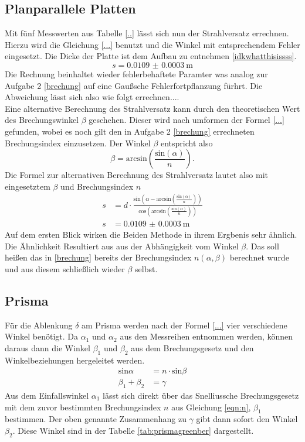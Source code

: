 \subsection{Planparallele Platten}
Mit fünf Messwerten aus Tabelle \ref{..} lässt sich nun der Strahlversatz errechnen. Hierzu wird die Gleichung \eqref{...}
benutzt und die Winkel mit entsprechendem Fehler eingesetzt. Die Dicke der Platte ist dem Aufbau zu entnehmen \ref{idkwhatthisissss}.
\begin{equation*}
    s = \SI{0.0109(00003)}{\meter}
\end{equation*}
Die Rechnung beinhaltet wieder fehlerbehaftete Paramter was analog zur Aufgabe 2 \ref{brechung} auf eine Gaußsche Fehlerfortpflanzung 
fürhrt. Die Abweichung lässt sich also wie folgt errechnen....
\\

Eine alternative Berechnung des Strahlversatz kann durch den theoretischen Wert des Brechungswinkel $\beta$ geschehen. 
Dieser wird nach umformen der Formel \eqref{...} gefunden, wobei es noch gilt den in Aufgabe 2 \ref{brechung} errechneten Brechungsindex
einzusetzen. Der Winkel $\beta$ entspricht also
\begin{equation*}
    \beta  = \text{arcsin} \left( \frac{\text{sin}(\alpha)}{n}\right).
\end{equation*}
Die Formel zur alternativen Berechnung des Strahlversatz lautet also mit eingesetztem $\beta$ und Brechungsindex $n$
\begin{align*}
    s &= d  \cdot \frac{\text{sin} \left (  \alpha- \text{arcsin} \left( \frac{\text{sin}(\alpha)}{n}\right) \right)} {\text{cos}\left(\text{arcsin} \left( \frac{\text{sin}(\alpha)}{n}\right)\right)}\\
    s &= \SI{0.0109(00003)}{\meter}
\end{align*}
Auf dem ersten Blick wirken die Beiden Methode in ihrem Ergbenis sehr ähnlich. Die Ähnlichkeit Resultiert aus 
aus der Abhängigkeit vom Winkel $\beta$. Das soll heißen das in \ref{brechung} bereits der Brechungsindex $n(\alpha, \beta)$
berechnet wurde und aus diesem schließlich wieder $\beta$ selbst. 

\subsection{Prisma}
Für die Ablenkung $\delta$ am Prisma werden nach der Formel \eqref{...} vier verschiedene Winkel benötigt. 
Da $\alpha_1$ und $\alpha_2$  aus den Messreihen entnommen werden, können daraus dann die Winkel $\beta_1$ und $\beta_2$ aus dem Brechungsgesetz und den Winkelbeziehungen hergeleitet werden.
\begin{align*}
    \text{sin}\alpha &= n \cdot \text{sin}\beta \\
    \beta_1 + \beta_2 &= \gamma
\end{align*}
Aus dem Einfallswinkel $\alpha_1$ lässt sich direkt über das Snelliussche Brechungsgesetz mit dem zuvor bestimmten Brechungsindex $n$ aus Gleichung \eqref{eqn:n}, $\beta_1$ bestimmen.
Der oben genannte Zusammenhang zu $\gamma$ gibt dann sofort den Winkel $\beta_2$. Diese Winkel sind in der Tabelle \ref{tab:prismagreenber} dargestellt.


